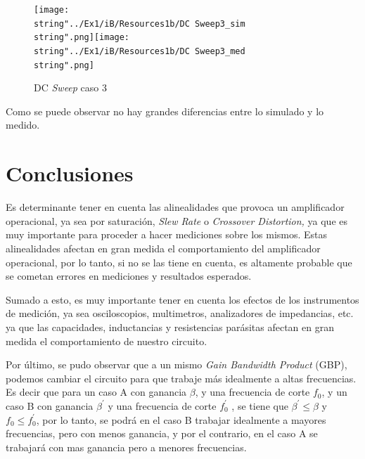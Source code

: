 \begin{figure}[H]
\begin{centering}
\texttt{[image: \\string"../Ex1/iB/Resources1b/DC Sweep3\_sim\\string".png]}\texttt{[image: \\string"../Ex1/iB/Resources1b/DC Sweep3\_med\\string".png]}
\par\end{centering}
\caption{DC \emph{Sweep} caso 3}
\end{figure}

Como se puede observar no hay grandes diferencias entre lo simulado
y lo medido.

\section{Conclusiones}

Es determinante tener en cuenta las alinealidades que provoca un amplificador
operacional, ya sea por saturación, \emph{Slew Rate }o \emph{Crossover
Distortion, }ya que es muy importante para proceder a hacer mediciones
sobre los mismos. Estas alinealidades afectan en gran medida el comportamiento
del amplificador operacional, por lo tanto, si no se las tiene en
cuenta, es altamente probable que se cometan errores en mediciones
y resultados esperados.

Sumado a esto, es muy importante tener en cuenta los efectos de los
instrumentos de medición, ya sea osciloscopios, multimetros, analizadores
de impedancias, etc. ya que las capacidades, inductancias y resistencias
parásitas afectan en gran medida el comportamiento de nuestro circuito.

Por último, se pudo observar que a un mismo \emph{Gain Bandwidth Product
}(GBP), podemos cambiar el circuito para que trabaje más idealmente
a altas frecuencias. Es decir que para un caso A con ganancia $\beta$,
y una frecuencia de corte $f_{0}$, y un caso B con ganancia $\beta^{'}$
y una frecuencia de corte $f_{0}^{'}$ , se tiene que $\beta^{'}\leq\beta$
y $f_{0}\leq f_{0}^{'}$, por lo tanto, se podrá en el caso B trabajar
idealmente a mayores frecuencias, pero con menos ganancia, y por el
contrario, en el caso A se trabajará con mas ganancia pero a menores
frecuencias.
